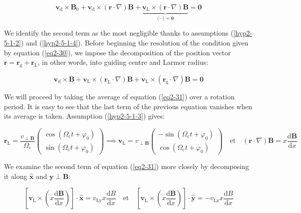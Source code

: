 \begin{equation}
    \label{eq2-30}
    \mathbf{v}_\mathrm{d}\times\mathbf{B}_0+\mathbf{v}_\mathrm{d}\times(\mathbf{r}\cdot\nabla)\mathbf{B}+\underbrace{\mathbf{v}_\text{L}\times(\mathbf{r}\cdot\nabla)\mathbf{B}}_{\langle\cdots\rangle=\mathbf{0}}=\mathbf{0}
\end{equation}

We identify the second term as the most negligible thanks to assumptions (\ref{hyp2-5-1-2}) and (\ref{hyp2-5-1-4}). Before beginning the resolution of the condition given by equation (\ref{eq2-30}), we impose the decomposition of the position vector $\mathbf{r}=\mathbf{r}_\text{g}+\mathbf{r}_\text{L}$, in other words, into guiding centre and Larmor radius:

\begin{equation}
    \label{eq2-31}
    \mathbf{v}_\mathrm{d}\times\mathbf{B}+\mathbf{v}_\text{L}\times(\mathbf{r}_\text{L}\cdot\nabla)\mathbf{B}+\mathbf{v}_\text{L}\times(\mathbf{r}_\text{g}\cdot\nabla)\mathbf{B}=\mathbf{0}
\end{equation}

We will proceed by taking the average of equation (\ref{eq2-31}) over a rotation period. It is easy to see that the last term of the previous equation vanishes when its average is taken. Assumption (\ref{hyp2-5-1-3}) gives:

\begin{equation}
    \mathbf{r}_\text{L}=\frac{v_{\perp\mathbf{B}}}{\Omega_\text{c}}\begin{pmatrix}
        \cos(\Omega_\text{c}t+\varphi_0)\\
        \sin(\Omega_\text{c}t+\varphi_0)
    \end{pmatrix}\implies\mathbf{v}_\text{L}=v_{\perp\mathbf{B}}\begin{pmatrix}
        -\sin(\Omega_\text{c}t+\varphi_0)\\
        \cos(\Omega_\text{c}t+\varphi_0)
    \end{pmatrix}\quad\text{et}\quad(\mathbf{r}\cdot\nabla)\mathbf{B}=x\frac{\mathrm{d}\mathbf{B}}{\mathrm{d}x}
\end{equation}

We examine the second term of equation (\ref{eq2-31}) more closely by decomposing it along $\mathbf{\hat{x}}$ and $\mathbf{\hat{y}}\perp\mathbf{B}$:

\begin{equation}
    \left[\mathbf{v}_\text{L}\times\left(x\frac{\mathrm{d}\mathbf{B}}{\mathrm{d}x}\right)\right]\cdot\mathbf{\hat{x}}=v_\text{Ly}x\frac{\mathrm{d}B}{\mathrm{d}x}\quad\text{et}\quad\left[\mathbf{v}_\text{L}\times\left(x\frac{\mathrm{d}\mathbf{B}}{\mathrm{d}x}\right)\right]\cdot\mathbf{\hat{y}}=-v_\text{Lx}x\frac{\mathrm{d}B}{\mathrm{d}x}
\end{equation}

